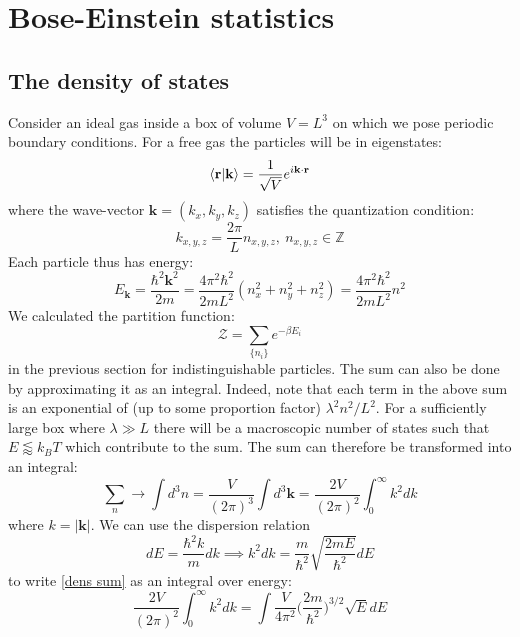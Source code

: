 \documentclass[a4paper,11pt,oneside]{book}
\begin{document}
\chapter{Bose-Einstein statistics}
\section{The density of states}
Consider an ideal gas inside a box of volume $V=L^3$ on which we pose periodic boundary conditions. For a free gas the particles will be in eigenstates:
\begin{equation}
    \braket{\textbf{r}|\textbf{k}} = \frac{1}{\sqrt{V}} e^{i\textbf{k}\cdot \textbf{r}}
\end{equation}
where the wave-vector $\textbf{k}=(k_x,k_y,k_z)$ satisfies the quantization condition:
\begin{equation}
    k_{x,y,z} = \frac{2\pi}{L}n_{x,y,z}, \ n_{x,y,z} \in \mathbb{Z}
\end{equation}
Each particle thus has energy:
\begin{equation}
    E_{\textbf{k}} = \frac{\hbar^2 \textbf{k}^2}{2m} = \frac{4\pi^2 \hbar^2}{2mL^2}(n_x^2+n_y^2+n_z^2) = \frac{4\pi^2 \hbar^2}{2mL^2}n^2
\end{equation}
We calculated the partition function:
\begin{equation}
    \mathcal{Z}=\sum_{\{n_i\}} e^{-\beta E_i}
\end{equation}
in the previous section for indistinguishable particles. The sum can also be done by approximating it as an integral. Indeed, note that each term in the above sum is an exponential of (up to some proportion factor) $\lambda^2n^2/L^2$. For a sufficiently large box where $\lambda \gg L$ there will be a macroscopic number of states such that $E\lessapprox k_B T$ which contribute to the sum. The sum can therefore be transformed into an integral:
\begin{equation}\label{dens sum}
    \sum_n \rightarrow \int d^3n = \frac{V}{(2\pi)^3} \int d^3\textbf{k} = \frac{2V}{(2\pi)^2} \int_0^\infty k^2 dk
\end{equation}
where $k=|\textbf{k}|$. We can use the dispersion relation
\begin{equation}
    dE = \frac{\hbar^2k}{m}dk \implies k^2 dk = \frac{m}{\hbar^2}\sqrt{\frac{2mE}{\hbar^2}} dE
\end{equation}
to write \eqref{dens sum} as an integral over energy:
\begin{equation}
     \frac{2V}{(2\pi)^2} \int_0^\infty k^2 dk=\int\frac{V}{4\pi^2}\bigg(\frac{2m}{\hbar^2}\bigg)^{3/2}\sqrt{E} dE 
\end{equation}
\end{document}
